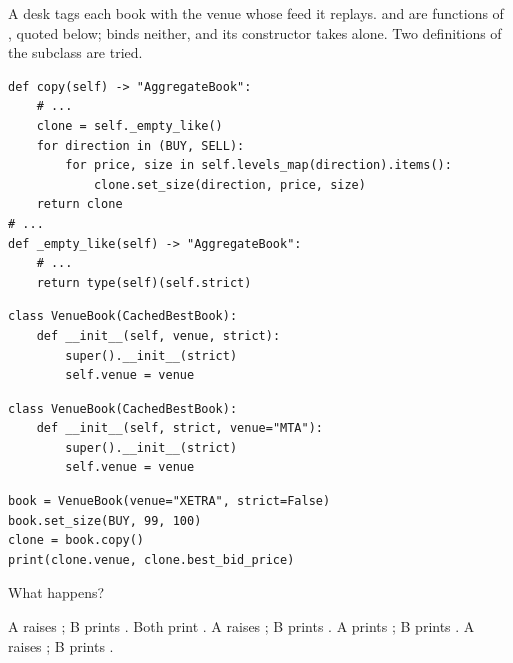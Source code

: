 \begin{question}
\label{question.copyOfABookWithAVenue}
A desk tags each book with the venue whose feed it replays.
 and  are functions of , quoted below;
 binds neither, and its constructor takes  alone.
Two definitions of the subclass are tried.
\begin{lstlisting}[caption={\protect\codehl{unito26.lob.orderbook.AggregateBook}: the copy, docstrings elided.}, label=listing.copyOfABookWithAVenueQuote]
def copy(self) -> "AggregateBook":
    # ...
    clone = self._empty_like()
    for direction in (BUY, SELL):
        for price, size in self.levels_map(direction).items():
            clone.set_size(direction, price, size)
    return clone
# ...
def _empty_like(self) -> "AggregateBook":
    # ...
    return type(self)(self.strict)
\end{lstlisting}
\begin{lstlisting}[caption={Alternative A}, label=listing.copyOfABookWithAVenueA]
class VenueBook(CachedBestBook):
    def __init__(self, venue, strict):
        super().__init__(strict)
        self.venue = venue
\end{lstlisting}
\begin{lstlisting}[caption={Alternative B}, label=listing.copyOfABookWithAVenueB]
class VenueBook(CachedBestBook):
    def __init__(self, strict, venue="MTA"):
        super().__init__(strict)
        self.venue = venue
\end{lstlisting}
\begin{lstlisting}[caption={Run once with each alternative}, label=listing.copyOfABookWithAVenueRun]
book = VenueBook(venue="XETRA", strict=False)
book.set_size(BUY, 99, 100)
clone = book.copy()
print(clone.venue, clone.best_bid_price)
\end{lstlisting}
What happens?
\begin{choices}
 \correctchoice A raises ; B prints .
 \choice Both print .
 \choice A raises ; B prints .
 \choice A prints ; B prints .
 \choice A raises ; B prints .
\end{choices}
\end{question}

